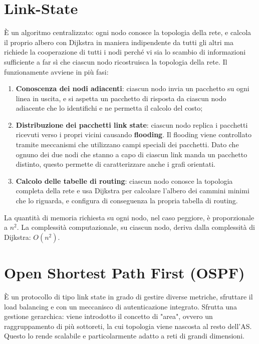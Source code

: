 \documentclass{article}
\begin{document}
\section{Link-State}
È un algoritmo centralizzato: ogni nodo conosce la topologia della rete, e calcola il proprio albero con Dijkstra in maniera indipendente da tutti gli altri ma richiede la cooperazione di tutti i nodi perché vi sia lo scambio di informazioni sufficiente a far sì che ciascun nodo ricostruisca la topologia della rete.
\newpage
Il funzionamente avviene in più fasi:
\begin{enumerate}
    \item \textbf{Conoscenza dei nodi adiacenti}: ciascun nodo invia un pacchetto su ogni linea in uscita, e si aspetta un pacchetto di risposta da ciascun nodo adiacente che lo identifichi e ne permetta il calcolo del costo;
    \item \textbf{Distribuzione dei pacchetti link state}: ciascun nodo replica i pacchetti ricevuti verso i propri vicini causando \textbf{flooding}. Il flooding viene controllato tramite meccanismi che utilizzano campi speciali dei pacchetti.
    Dato che ognuno dei due nodi che stanno a capo di ciascun link manda un pacchetto distinto, questo permette di caratterizzare anche i grafi orientati.
    \item \textbf{Calcolo delle tabelle di routing}: ciascun nodo conosce la topologia completa della rete e usa Dijkstra per calcolare l'albero dei cammini minimi che lo riguarda, e configura di conseguenza la propria tabella di routing.
\end{enumerate}
La quantità di memoria richiesta su ogni nodo, nel caso peggiore, è proporzionale a $n^{2}$.
La complessità computazionale, su ciascun nodo, deriva dalla complessità di Dijkstra: $O(n^{2})$.
\section{Open Shortest Path First (OSPF)}
È un protocollo di tipo link state in grado di gestire diverse metriche, sfruttare il load balancing e con un meccanisco di autenticazione integrato.
Sfrutta una gestione gerarchica: viene introdotto il concetto di "area", ovvero un raggruppamento di più sottoreti, la cui topologia viene nascosta al resto dell’AS. Questo lo rende scalabile e particolarmente adatto a reti di grandi dimensioni.
\end{document}
